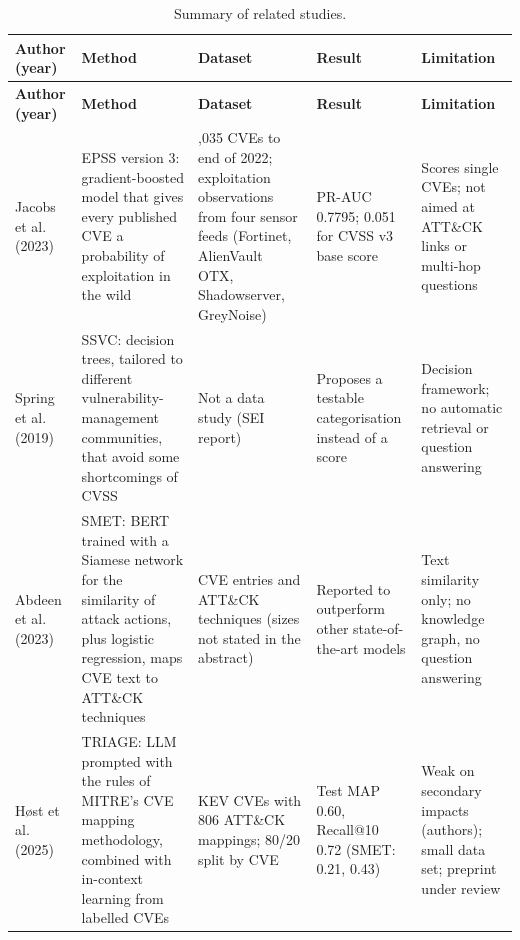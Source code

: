 \documentclass[12pt, a4paper]{article}
\begin{document}
{\footnotesize\setlength{\tabcolsep}{4pt}
\begin{longtable}{>{\raggedright\arraybackslash}p{2.2cm}>{\raggedright\arraybackslash}p{3.5cm}>{\raggedright\arraybackslash}p{2.6cm}>{\raggedright\arraybackslash}p{2.7cm}>{\raggedright\arraybackslash}p{3.4cm}}
\caption{Summary of related studies.}\label{tab:lit}\\ \toprule
\textbf{Author (year)} & \textbf{Method} & \textbf{Dataset} & \textbf{Result} & \textbf{Limitation} \\ \midrule \endfirsthead
\toprule \textbf{Author (year)} & \textbf{Method} & \textbf{Dataset} & \textbf{Result} & \textbf{Limitation} \\ \midrule \endhead
\bottomrule \endfoot
Jacobs et al.~\cite{jacobs2023} (2023) & EPSS version 3: gradient-boosted model that gives every published CVE a probability of exploitation in the wild & 192,035 CVEs to end of 2022; exploitation observations from four sensor feeds (Fortinet, AlienVault OTX, Shadowserver, GreyNoise) & PR-AUC 0.7795; 0.051 for CVSS v3 base score & Scores single CVEs; not aimed at ATT\&CK links or multi-hop questions \\ \midrule
Spring et al.~\cite{spring2019} (2019) & SSVC: decision trees, tailored to different vulnerability-management communities, that avoid some shortcomings of CVSS & Not a data study (SEI report) & Proposes a testable categorisation instead of a score & Decision framework; no automatic retrieval or question answering \\ \midrule
Abdeen et al.~\cite{abdeen2023} (2023) & SMET: BERT trained with a Siamese network for the similarity of attack actions, plus logistic regression, maps CVE text to ATT\&CK techniques & CVE entries and ATT\&CK techniques (sizes not stated in the abstract) & Reported to outperform other state-of-the-art models & Text similarity only; no knowledge graph, no question answering \\ \midrule
H{\o}st et al.~\cite{host2025} (2025) & TRIAGE: LLM prompted with the rules of MITRE's CVE mapping methodology, combined with in-context learning from labelled CVEs & 296 KEV CVEs with 806 ATT\&CK mappings; 80/20 split by CVE & Test MAP 0.60, Recall@10 0.72 (SMET: 0.21, 0.43) & Weak on secondary impacts (authors); small data set; preprint under review \\ \midrule

\end{longtable}}
\end{document}
